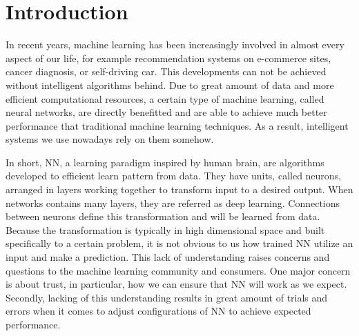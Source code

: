 \chapter{Introduction}
\label{cha:chapter1}
In recent years, machine learning  has been increasingly involved in almost every aspect of our life, for example recommendation systems on e-commerce sites, cancer diagnosis, or self-driving car. This developments can not be achieved without intelligent algorithms behind. Due to great amount of data and more efficient computational resources, a certain type of machine learning, called neural networks, are directly benefitted and are able to achieve much better performance that traditional machine learning techniques. As a result, intelligent systems we use nowadays rely on them somehow.


In short, NN, a learning paradigm inspired by human brain, are algorithms developed to efficient learn pattern from data. They have units, called neurons, arranged in layers working together to transform input to a desired output. When networks contains many layers, they are referred as deep learning. Connections between neurons define this transformation and will be learned from data. Because the transformation is typically in high dimensional space and built specifically to a certain problem, it is not obvious to us how trained NN utilize an input and make a prediction.  This lack of understanding  raises concerns and questions to the machine learning community and consumers. One major concern is about trust, in particular, how we can ensure that NN will work as we expect. Secondly, lacking of this understanding results in great amount of trials and errors when it comes to adjust configurations of NN to achieve expected performance.

